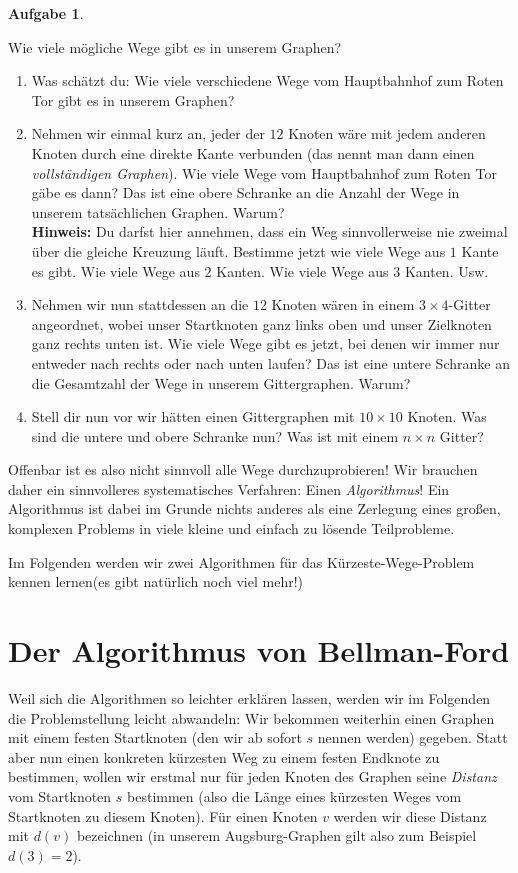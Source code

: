 \documentclass[a4paper,ngerman,12pt]{scrartcl}
\theoremstyle{definition}
\newtheorem{aufg}{Aufgabe}
\newenvironment{aufgabe}[1][]
		{\begin{shaded}\vspace{-0.3cm}\begin{aufg}\emph{#1} \par\medskip}
		{\end{aufg}\vspace{-0.3cm}\end{shaded}}
\theoremstyle{plain}
\theoremstyle{remark}
\begin{document}
\begin{aufgabe}\label{aufg:WegeZahlen}
	Wie viele mögliche Wege gibt es in unserem Graphen?
	\begin{enumerate}[label=\alph*)]
		\item Was schätzt du: Wie viele verschiedene Wege vom Hauptbahnhof zum Roten Tor gibt es in unserem Graphen?
		\item Nehmen wir einmal kurz an, jeder der $12$ Knoten wäre mit jedem anderen Knoten durch eine direkte Kante verbunden (das nennt man dann einen \emph{vollständigen Graphen}). Wie viele Wege vom Hauptbahnhof zum Roten Tor gäbe es dann? Das ist eine obere Schranke an die Anzahl der Wege in unserem tatsächlichen Graphen. Warum?\\
		\textbf{Hinweis:} Du darfst hier annehmen, dass ein Weg sinnvollerweise nie zweimal über die gleiche Kreuzung läuft. Bestimme jetzt wie viele Wege aus $1$ Kante es gibt. Wie viele Wege aus $2$ Kanten. Wie viele Wege aus $3$ Kanten. Usw.
		\item Nehmen wir nun stattdessen an die $12$ Knoten wären in einem $3\times 4$-Gitter angeordnet, wobei unser Startknoten ganz links oben und unser Zielknoten ganz rechts unten ist. Wie viele Wege gibt es jetzt, bei denen wir immer nur entweder nach rechts oder nach unten laufen? Das ist eine untere Schranke an die Gesamtzahl der Wege in unserem Gittergraphen. Warum?
		\item Stell dir nun vor wir hätten einen Gittergraphen mit $10\times 10$ Knoten. Was sind die untere und obere Schranke nun? Was ist mit einem $n \times n$ Gitter?
	\end{enumerate}
\end{aufgabe}

Offenbar ist es also nicht sinnvoll alle Wege durchzuprobieren! Wir brauchen daher ein sinnvolleres systematisches Verfahren: Einen \emph{Algorithmus}! Ein Algorithmus ist dabei im Grunde nichts anderes als eine Zerlegung eines großen, komplexen Problems in viele kleine und einfach zu lösende Teilprobleme. 

Im Folgenden werden wir zwei Algorithmen für das Kürzeste-Wege-Problem kennen lernen(es gibt natürlich noch viel mehr!)

\section{Der Algorithmus von Bellman-Ford}

Weil sich die Algorithmen so leichter erklären lassen, werden wir im Folgenden die Problemstellung leicht abwandeln: Wir bekommen weiterhin einen Graphen mit einem festen Startknoten (den wir ab sofort $s$ nennen werden) gegeben. Statt aber nun einen konkreten kürzesten Weg zu einem festen Endknote zu bestimmen, wollen wir erstmal nur für jeden Knoten des Graphen seine \emph{Distanz} vom Startknoten $s$ bestimmen (also die Länge eines kürzesten Weges vom Startknoten zu diesem Knoten). Für einen Knoten $v$ werden wir diese Distanz mit $d(v)$ bezeichnen (in unserem Augsburg-Graphen gilt also zum Beispiel $d(3)=2$).
\end{document}
